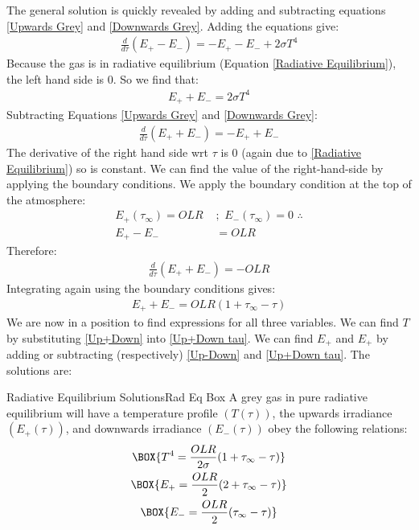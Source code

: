 The general solution is quickly revealed by adding and subtracting equations \ref{Upwards Grey} and \ref{Downwards Grey}. Adding the equations give:
\begin{align*}
    \frac{d}{d\tau}(E_+-E_-)=-E_+-E_-+2\sigma T^4
\end{align*}
Because the gas is in radiative equilibrium (Equation \ref{Radiative Equilibrium}), the left hand side is $0$. So we find that:
\begin{align}\label{Up+Down}
    E_++E_-=2\sigma T^4
\end{align}
Subtracting Equations \ref{Upwards Grey} and \ref{Downwards Grey}:
\begin{align*}
    \frac{d}{d\tau}(E_++E_-)=-E_++E_-
\end{align*}
The derivative of the right hand side wrt $\tau$ is $0$ (again due to \ref{Radiative Equilibrium}) so is constant. We can find the value of the right-hand-side by applying the boundary conditions. We apply the boundary condition at the top of the atmosphere:
\begin{align}
    E_+(\tau_\infty)=OLR \,\, &;\,\,  
    E_-(\tau_\infty)=0\,\, \therefore\nonumber\\
    E_+-E_-&=OLR\label{Up-Down}
\end{align}
Therefore:
\begin{align*}
    \frac{d}{d\tau}(E_++E_-)=-OLR
\end{align*}
Integrating again using the boundary conditions gives:
\begin{align}
    E_++E_-=OLR(1+\tau_\infty-\tau)\label{Up+Down tau}
\end{align}
We are now in a position to find expressions for all three variables. We can find $T$ by substituting \ref{Up+Down} into \ref{Up+Down tau}. We can find $E_+$ and $E_+$ by adding or subtracting (respectively) \ref{Up-Down} and \ref{Up+Down tau}. The solutions are:
\begin{fact}{Radiative Equilibrium Solutions}{Rad Eq Box}\label{Rad Eq Box}
    A grey gas in pure radiative equilibrium will have a temperature profile $(T(\tau))$, the upwards irradiance $(E_+(\tau))$, and downwards irradiance $(E_-(\tau))$ obey the following relations:
    \begin{gather}
        \label{Radiative Eq Temperature}
        \BOX{T^4=\frac{OLR}{2\sigma}(1+\tau_\infty-\tau)}\\
        \BOX{E_+=\frac{OLR}{2}(2+\tau_\infty-\tau)}\\
        \BOX{E_-=\frac{OLR}{2}(\tau_\infty-\tau)}
    \end{gather}
\end{fact}

